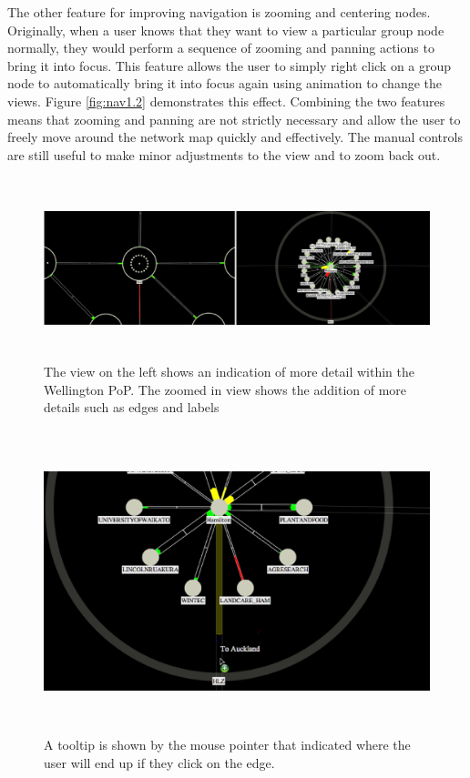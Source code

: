 \documentclass[11pt, a4paper]{article}
\begin{document}
The other feature for improving navigation is zooming and centering nodes.
Originally, when a user knows that they want to view a particular group node
normally, they would perform a sequence of zooming and panning actions to bring
it into focus. This feature allows the user to simply right click on a group
node to automatically bring it into focus again using animation to change the
views. Figure \ref{fig:nav1.2} demonstrates this effect. Combining the two
features means that zooming and panning are not strictly necessary and allow the
user to freely move around the network map quickly and effectively. The manual
controls are still useful to make minor adjustments to the view and to zoom back
out.

\begin{figure}
\centering
\includegraphics[width=170mm,height=53mm]{assets/nav1-0.eps}
\caption{The view on the left shows an indication of more detail within the
Wellington PoP. The zoomed in view shows the addition of more details such 
as edges and labels}
\label{fig:nav1.0}
\end{figure}

\begin{figure}
\centering
\includegraphics[width=170mm,height=88.01mm]{assets/nav1-1.eps}
\caption{A tooltip is shown by the mouse pointer that indicated where the user
will end up if they click on the edge.}
\label{fig:nav1.1}
\end{figure}
\end{document}
